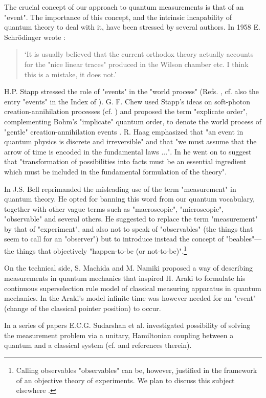 \documentclass[12pt]{article}
\begin{document}
The crucial concept of our approach to quantum measurements is that of an
"event". The importance of this concept, and the intrinsic incapability of
quantum theory to deal with it, have been stressed by several authors. In
1958 E. Schr\"odinger wrote \cite{sch1}:
\begin{quotation} \lq It is usually believed that the current orthodox
theory actually accounts for the "nice linear traces" produced in the
Wilson chamber etc. I think this is a mistake, it does not.\rq
\end{quotation}
H.P. Stapp stressed the role of "events" in the "world process" (Refs.
\cite{stap2,stap3}, cf. also the entry "events" in the Index of
\cite{stap4}). G. F. Chew used Stapp's ideas on soft-photon
creation-annihilation processes (cf. \cite{stap5}) and proposed the term
"explicate order", complementing Bohm's "implicate" quantum order, to
denote the world process of "gentle" creation-annihilation events
\cite{chew1}. R. Haag emphasized \cite{haag1} that "an event in quantum
physics is discrete and irreversible" and that "we must assume that the
arrow of time is encoded in the fundamental laws ...". In \cite{haag2} he
went on to suggest that "transformation of possibilities into facts must be
an essential ingredient which must be included in the fundamental
formulation of the theory".

In \cite{bel1,bel2} J.S. Bell reprimanded the misleading use of the term
"measurement" in quantum theory. He opted for banning this word from our
quantum vocabulary, together with other vague terms such as "macroscopic",
"microscopic", "observable" and several others. He suggested to replace the
term "measurement" by that of "experiment", and also not to speak of
"observables" (the things that seem to call for an "observer") but to
introduce instead the concept of "beables"---the things that objectively
"happen-to-be (or not-to-be)".\footnote{Calling observables
"observables" can be, however, justified in the framework of an objective
theory of experiments. We plan to discuss this subject elsewhere .}

On the technical side, S. Machida and M. Namiki \cite{mach1} proposed a way
of describing measurements in quantum mechanics that inspired H. Araki
\cite{ara1,ara2} to formulate his continuous superselection rule model of
classical measuring apparatus in quantum mechanics. In the Araki's model
infinite time was however needed for an "event" (change of the classical
pointer position) to occur.

In a series of papers E.C.G. Sudarshan et al.  investigated possibility
of solving the measurement problem via a unitary, Hamiltonian
coupling between a quantum and a classical system (cf. \cite{su1} and
references therein).
\end{document}
